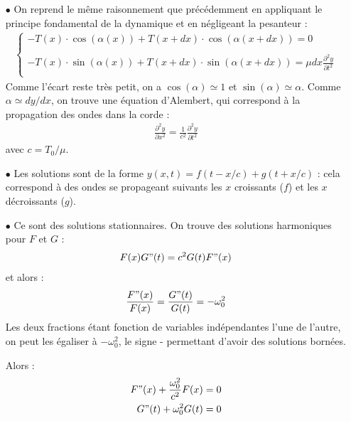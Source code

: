 \documentclass{report}
\begin{document}
\begin{itemize}

\item[$\bullet$] On reprend le même raisonnement que précédemment en appliquant le principe fondamental de la dynamique et en négligeant la pesanteur :
	\begin{align*}
	\left\lbrace
	\begin{array}{ccc}
	-T(x)\cdot\cos(\alpha(x))+T(x+dx)\cdot\cos(\alpha(x+dx))=0\\
	\\
	-T(x)\cdot\sin(\alpha(x))+T(x+dx)\cdot\sin(\alpha(x+dx))=\mu dx\frac{\partial^2 y}{\partial t^2}\\
	\end{array}\right.
	\end{align*}		
Comme l'écart reste très petit, on a $\cos(\alpha)\simeq1$ et $\sin(\alpha)\simeq\alpha$. Comme $\alpha\simeq dy/dx$, on trouve une équation d'Alembert, qui correspond à la propagation des ondes dans la corde :
	\begin{align*}
		\frac{\partial^2y}{\partial x^2}=\frac{1}{c^2}\frac{\partial^2y}{\partial t^2}
	\end{align*}
	avec $c=T_0/\mu$.

\item[$\bullet$] Les solutions sont de la forme $y(x,t)=f(t-x/c)+g(t+x/c)$ : cela correspond à des ondes se propageant suivants les $x$ croissants ($f$) et les $x$ décroissants ($g$).

\item[$\bullet$] Ce sont des solutions stationnaires. On trouve des solutions harmoniques pour $F$ et $G$ :
\begin{align*}
	F(x)G"(t)=c^2G(t)F"(x)
\end{align*}
et alors :
\begin{align*}
	\frac{F"(x)}{F(x)} =\frac{G"(t)}{G(t)} = -\omega_0^2
\end{align*}
Les deux fractions étant fonction de variables indépendantes l'une de l'autre, on peut les égaliser à $-\omega_0^2$, le signe - permettant d'avoir des solutions bornées. 

Alors : 
\begin{align*}
	F"(x)+\frac{\omega_0^2}{c^2}F(x)&=0\\
	G"(t)+\omega_0^2G(t)&=0
\end{align*}


\end{itemize}
\end{document}
